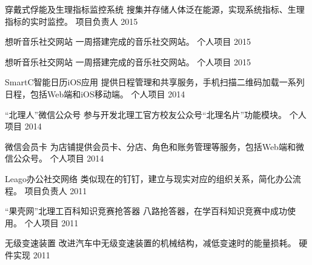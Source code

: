 \begin{cventries}
\begin{cvhonors}
\cvhonor
{穿戴式俘能及生理指标监控系统} %
{搜集并存储人体泛在能源，实现系统指标、生理指标的实时监控。} %
{项目负责人} %
{2015} %

\cvhonor
{想听音乐社交网站} %
{一周搭建完成的音乐社交网站。} %
{个人项目} %
{2015} %

\cvhonor
{想听音乐社交网站} %
{一周搭建完成的音乐社交网站。} %
{个人项目} %
{2015} %

\cvhonor
{SmartC智能日历iOS应用} %
{提供日程管理和共享服务，手机扫描二维码加载一系列日程，包括Web端和iOS移动端。} %
{个人项目} %
{2014} %

\cvhonor
{“北理人”微信公众号} %
{参与开发北理工官方校友公众号“北理名片”功能模块。} %
{个人项目} %
{2014} %

\cvhonor
{微信会员卡} %
{为店铺提供会员卡、分店、角色和账务管理等服务，包括Web端和微信公众号。} %
{个人项目} %
{2014} %

\cvhonor
{Leago办公社交网络} %
{类似现在的钉钉，建立与现实对应的组织关系，简化办公流程。} %
{项目负责人} %
{2011} %

\cvhonor
{“果壳网”北理工百科知识竞赛抢答器} %
{八路抢答器，在学百科知识竞赛中成功使用。} %
{个人项目} %
{2011} %

\cvhonor
{无级变速装置} %
{改进汽车中无级变速装置的机械结构，减低变速时的能量损耗。} %
{硬件实现} %
{2011} %

\end{cvhonors}


\end{cventries}